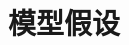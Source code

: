 \chapter[\hspace{0pt}模型假设]{{\heiti{}\hspace{0pt}模型假设}}\label{chapter2:模型假设}

\removelofgap
\removelotgap

